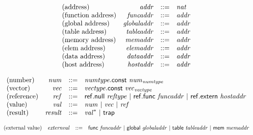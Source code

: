 $$
\begin{array}{@{}lrrl@{}l@{}}
\mbox{(address)} & {\mathit{addr}} &::=& {\mathit{nat}} \\
\mbox{(function address)} & {\mathit{funcaddr}} &::=& {\mathit{addr}} \\
\mbox{(global address)} & {\mathit{globaladdr}} &::=& {\mathit{addr}} \\
\mbox{(table address)} & {\mathit{tableaddr}} &::=& {\mathit{addr}} \\
\mbox{(memory address)} & {\mathit{memaddr}} &::=& {\mathit{addr}} \\
\mbox{(elem address)} & {\mathit{elemaddr}} &::=& {\mathit{addr}} \\
\mbox{(data address)} & {\mathit{dataaddr}} &::=& {\mathit{addr}} \\
\mbox{(host address)} & {\mathit{hostaddr}} &::=& {\mathit{addr}} \\
\end{array}
$$

\vspace{1ex}

\vspace{1ex}

$$
\begin{array}{@{}lrrl@{}l@{}}
\mbox{(number)} & {\mathit{num}} &::=& {\mathit{numtype}}.\mathsf{const}~{{\mathit{num}}}_{{\mathit{numtype}}} \\
\mbox{(vector)} & {\mathit{vec}} &::=& {\mathit{vectype}}.\mathsf{const}~{{\mathit{vec}}}_{{\mathit{vectype}}} \\
\mbox{(reference)} & {\mathit{ref}} &::=& \mathsf{ref.null}~{\mathit{reftype}} ~|~ \mathsf{ref.func}~{\mathit{funcaddr}} ~|~ \mathsf{ref.extern}~{\mathit{hostaddr}} \\
\mbox{(value)} & {\mathit{val}} &::=& {\mathit{num}} ~|~ {\mathit{vec}} ~|~ {\mathit{ref}} \\
\mbox{(result)} & {\mathit{result}} &::=& {{\mathit{val}}^\ast} ~|~ \mathsf{trap} \\
\end{array}
$$

\vspace{1ex}

$$
\begin{array}{@{}lrrl@{}l@{}}
\mbox{(external value)} & {\mathit{externval}} &::=& \mathsf{func}~{\mathit{funcaddr}} ~|~ \mathsf{global}~{\mathit{globaladdr}} ~|~ \mathsf{table}~{\mathit{tableaddr}} ~|~ \mathsf{mem}~{\mathit{memaddr}} \\
\end{array}
$$

